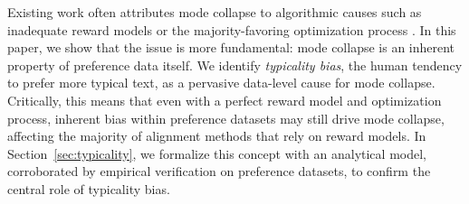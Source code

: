 


Existing work often attributes mode collapse to algorithmic causes such as inadequate reward models \citep{chakraborty2024maxmin} or the majority-favoring optimization process \citep{xiao2024algorithmic}. {In this paper, we show that the issue is more fundamental: mode collapse is an inherent property of preference data itself}.  We identify \emph{typicality bias}, the human tendency to prefer more typical text, as a pervasive data-level cause for mode collapse. Critically, this means that even with a perfect reward model and optimization process, inherent bias within preference datasets may still drive mode collapse, affecting the majority of alignment methods that rely on reward models. In Section~\ref{sec:typicality}, we formalize this concept with an analytical model, corroborated by empirical verification on preference datasets, to confirm the central role of typicality bias.





